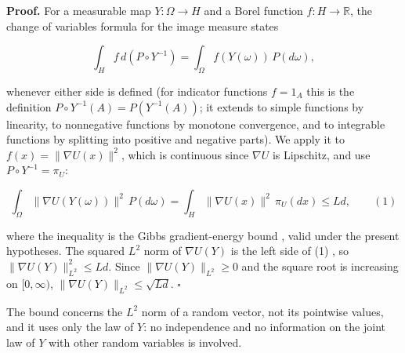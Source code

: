 \documentclass[11pt,a4paper]{article}
\begin{document}
\textbf{Proof.} For a measurable map \(Y:\Omega\to H\) and a Borel function \(f:H\to\mathbb R\), the change of variables formula for the image measure states


\[\int_Hf\,d(P\circ Y^{-1})=\int_\Omega f(Y(\omega))\,P(d\omega),\]


whenever either side is defined (for indicator functions \(f=1_A\) this is the definition \(P\circ Y^{-1}(A)=P(Y^{-1}(A))\); it extends to simple functions by linearity, to nonnegative functions by monotone convergence, and to integrable functions by splitting into positive and negative parts). We apply it to \(f(x)=\|\nabla U(x)\|^2\), which is continuous since \(\nabla U\) is Lipschitz, and use \(P\circ Y^{-1}=\pi_U\):


\[\int_\Omega\|\nabla U(Y(\omega))\|^2\,P(d\omega)=\int_H\|\nabla U(x)\|^2\,\pi_U(dx)\le Ld,\qquad(1)\]


where the inequality is the Gibbs gradient-energy bound \cite[Section~3.27.6]{LangevinLean2026ULASC}, valid under the present hypotheses. The squared \(L^2\) norm of \(\nabla U(Y)\) is the left side of (1) \cite[Section~3.13.9]{LangevinLean2026ULASC}, so \(\|\nabla U(Y)\|_{L^2}^2\le Ld\). Since \(\|\nabla U(Y)\|_{L^2}\ge0\) and the square root is increasing on \([0,\infty)\), \(\|\nabla U(Y)\|_{L^2}\le\sqrt{Ld}\). \(\square\)




The bound concerns the \(L^2\) norm of a random vector, not its pointwise values, and it uses only the law of \(Y\): no independence and no information on the joint law of \(Y\) with other random variables is involved.
\end{document}
